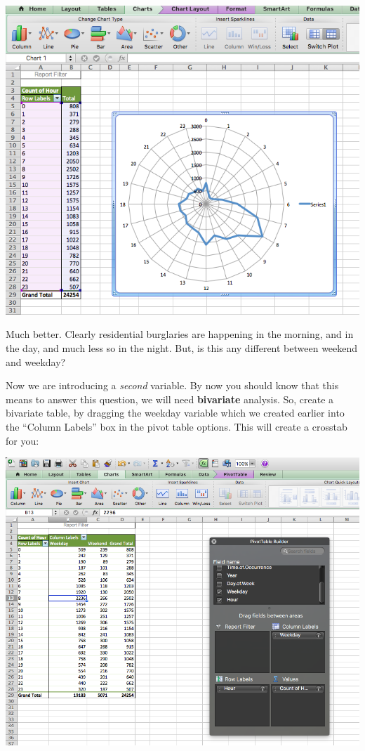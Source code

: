\documentclass[
]{book}
\begin{document}
\includegraphics{imgs/correct_hr_1.png}

Much better. Clearly residential burglaries are happening in the morning, and in the day, and much less so in the night. But, is this any different between weekend and weekday?

Now we are introducing a \emph{second} variable. By now you should know that this means to answer this question, we will need \textbf{bivariate} analysis. So, create a bivariate table, by dragging the weekday variable which we created earlier into the ``Column Labels'' box in the pivot table options. This will create a crosstab for you:

\includegraphics{imgs/bi_radar_1.png}
\end{document}
